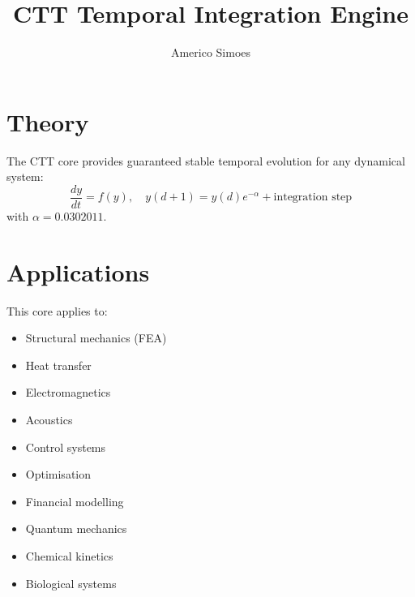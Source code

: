 \documentclass[12pt]{article}
\begin{document}
\title{CTT Temporal Integration Engine}
\author{Americo Simoes}
\maketitle

\section{Theory}
The CTT core provides guaranteed stable temporal evolution for any dynamical system:
\[
\frac{dy}{dt} = f(y), \quad y(d+1) = y(d) e^{-\alpha} + \text{integration step}
\]
with \(\alpha = 0.0302011\).

\section{Applications}
This core applies to:
\begin{itemize}
    \item Structural mechanics (FEA)
    \item Heat transfer
    \item Electromagnetics
    \item Acoustics
    \item Control systems
    \item Optimisation
    \item Financial modelling
    \item Quantum mechanics
    \item Chemical kinetics
    \item Biological systems
\end{itemize}
\end{document}
